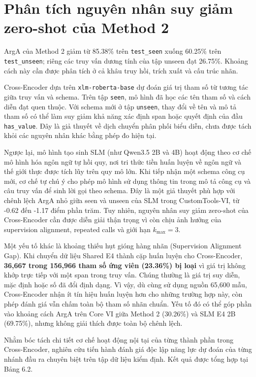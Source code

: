 \section{Phân tích nguyên nhân suy giảm zero-shot của Method 2}

ArgA của Method 2 giảm từ 85.38\% trên \texttt{test_seen} xuống 60.25\% trên \texttt{test_unseen}; riêng các truy vấn dương tính của tập unseen đạt 26.75\%. Khoảng cách này cần được phân tích ở cả khâu truy hồi, trích xuất và cấu trúc nhãn.

Cross-Encoder dựa trên \texttt{xlm-roberta-base} dự đoán giá trị tham số từ tương tác giữa truy vấn và schema. Trên tập \texttt{seen}, mô hình đã học các tên tham số và cách diễn đạt quen thuộc. Với schema mới ở tập \texttt{unseen}, thay đổi về tên và mô tả tham số có thể làm suy giảm khả năng xác định span hoặc quyết định của đầu \texttt{has_value}. Đây là giả thuyết về dịch chuyển phân phối biểu diễn, chưa được tách khỏi các nguyên nhân khác bằng phép đo hiện tại.

Ngược lại, mô hình tạo sinh SLM (như Qwen3.5 2B và 4B) hoạt động theo cơ chế mô hình hóa ngôn ngữ tự hồi quy, nơi tri thức tiền huấn luyện về ngôn ngữ và thế giới thực được tích lũy trên quy mô lớn. Khi tiếp nhận một schema công cụ mới, cơ chế tự chú ý cho phép mô hình sử dụng thông tin trong mô tả công cụ và câu truy vấn để sinh lời gọi theo schema. Đây là một giả thuyết phù hợp với chênh lệch ArgA nhỏ giữa seen và unseen của SLM trong CustomTools-VI, từ -0.62 đến -1.17 điểm phần trăm. Tuy nhiên, nguyên nhân suy giảm zero-shot của Cross-Encoder cần được diễn giải thận trọng vì còn chịu ảnh hưởng của supervision alignment, repeated calls và giới hạn $k_{\max}=3$.

Một yếu tố khác là khoảng thiếu hụt gióng hàng nhãn (Supervision Alignment Gap). Khi chuyển dữ liệu Shared E4 thành cặp huấn luyện cho Cross-Encoder, \textbf{36,667 trong 156,966 tham số ứng viên (23.36\%) bị loại} vì giá trị không khớp trực tiếp với một span trong truy vấn. Chúng thường là giá trị suy diễn, mặc định hoặc số đã đổi định dạng. Vì vậy, dù cùng sử dụng nguồn 65,600 mẫu, Cross-Encoder nhận ít tín hiệu huấn luyện hơn cho những trường hợp này, còn phép đánh giá vẫn chấm toàn bộ tham số nhãn chuẩn. Yếu tố đó có thể góp phần vào khoảng cách ArgA trên Core VI giữa Method 2 (30.26\%) và SLM E4 2B (69.75\%), nhưng không giải thích được toàn bộ chênh lệch.

Nhằm bóc tách chi tiết cơ chế hoạt động nội tại của từng thành phần trong Cross-Encoder, nghiên cứu tiến hành đánh giá độc lập năng lực dự đoán của từng nhánh đầu ra chuyên biệt trên tập dữ liệu kiểm định. Kết quả được tổng hợp tại Bảng 6.2.


